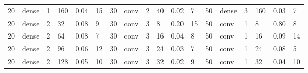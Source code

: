 \begin{table}[t!]
{\begin{tabular}{@{}llllll|llllll|llllll@{}}
20                              & dense                          & 1                              & 160                            & 0.04                             & 15                                & 30                              & conv                           & 2                              & 40                             & 0.02                           & 7                                 & 50                              & dense                          & 3                              & 160                            & 0.03                           & 7                                \\
20                              & dense                          & 2                              & 32                             & 0.08                             & 9                                 & 30                              & conv                           & 3                              & 8                              & 0.20                           & 15                                & 50                              & conv                           & 1                              & 8                              & 0.80                           & 8                                \\
20                              & dense                          & 2                              & 64                             & 0.08                             & 7                                 & 30                              & conv                           & 3                              & 16                             & 0.04                           & 8                                 & 50                              & conv                           & 1                              & 16                             & 0.09                           & 14                               \\
20                              & dense                          & 2                              & 96                             & 0.06                             & 12                                & 30                              & conv                           & 3                              & 24                             & 0.03                           & 7                                 & 50                              & conv                           & 1                              & 24                             & 0.08                           & 5                                \\
20                              & dense                          & 2                              & 128                            & 0.05                             & 10                                & 30                              & conv                           & 3                              & 32                             & 0.02                           & 9                                 & 50                              & conv                           & 1                              & 32                             & 0.04                           & 10                               \\

\end{tabular}}
\end{table}
